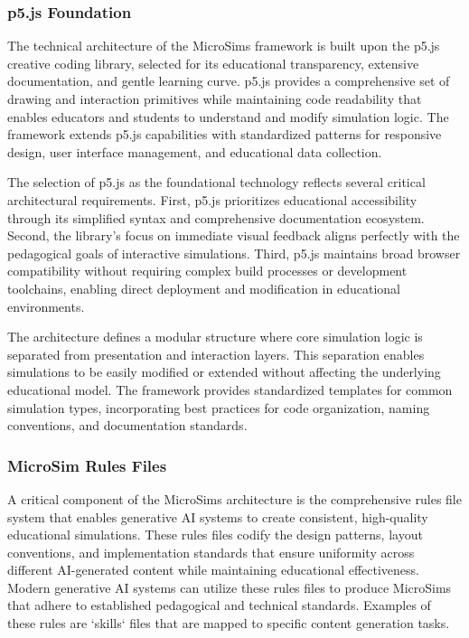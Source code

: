 \subsubsection{p5.js Foundation}

The technical architecture of the MicroSims framework is built upon the p5.js creative coding library, selected for its educational transparency, extensive documentation, and gentle learning curve. p5.js provides a comprehensive set of drawing and interaction primitives while maintaining code readability that enables educators and students to understand and modify simulation logic. The framework extends p5.js capabilities with standardized patterns for responsive design, user interface management, and educational data collection.

The selection of p5.js as the foundational technology reflects several critical architectural requirements. First, p5.js prioritizes educational accessibility through its simplified syntax and comprehensive documentation ecosystem. Second, the library's focus on immediate visual feedback aligns perfectly with the pedagogical goals of interactive simulations. Third, p5.js maintains broad browser compatibility without requiring complex build processes or development toolchains, enabling direct deployment and modification in educational environments.

The architecture defines a modular structure where core simulation logic is separated from presentation and interaction layers. This separation enables simulations to be easily modified or extended without affecting the underlying educational model. The framework provides standardized templates for common simulation types, incorporating best practices for code organization, naming conventions, and documentation standards.

\subsubsection{MicroSim Rules Files}

A critical component of the MicroSims architecture is the comprehensive rules file system that enables generative AI systems to create consistent, high-quality educational simulations. These rules files codify the design patterns, layout conventions, and implementation standards that ensure uniformity across different AI-generated content while maintaining educational effectiveness.  Modern generative AI systems can utilize these rules files to produce MicroSims that adhere to established pedagogical and technical standards.  Examples of these rules are `skills` files that are mapped to specific content generation tasks.

